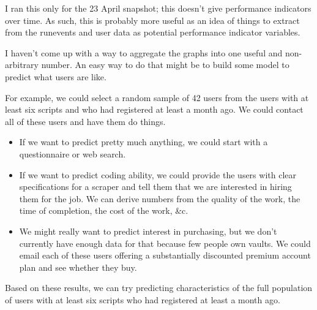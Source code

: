 \documentclass{article}
\begin{document}
I ran this only for the 23 April snapshot;
this doesn't give performance indicators
over time. As such, this is probably more
useful as an idea of things to extract from
the runevents and user data as potential
performance indicator variables.

I haven't come up with a way to aggregate
the graphs into one useful and non-arbitrary
number. An easy way to do that might be to
build some model to predict what users are like.

For example, we could select a random sample of
42 users from the users with at least six scripts
and who had registered at least a month ago.
We could contact all of these users and have
them do things.
\begin{itemize}
\item If we want to predict pretty much anything,
  we could start with a questionnaire or web search.
\item If we want to predict coding ability, we
  could provide the users with clear specifications
  for a scraper and tell them that we are interested
  in hiring them for the job. We can derive numbers
  from the quality of the work, the time of completion,
  the cost of the work, \&c.
\item We might really want to predict interest in
  purchasing, but we don't currently have enough data for
  that because few people own vaults. We could email
  each of these users offering a substantially discounted
  premium account plan and see whether they buy.
\end{itemize}
Based on these results, we can try predicting characteristics
of the full population of users with at least six scripts
who had registered at least a month ago.
\end{document}
